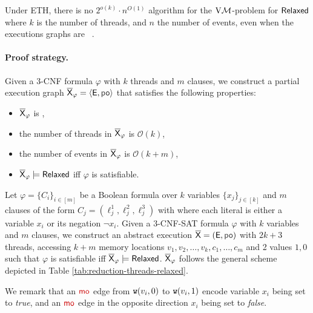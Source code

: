 \begin{theorem}\label{lem:relaxed-finegrained}
    Under ETH, there is no $2^{o(k)} \cdot n^{O(1)}$ algorithm for the $\mathrm{V}\mathcal{M}$-problem for $\mathsf{Relaxed}$ where $k$ is the number of threads, and $n$ the number of events, even when the executions graphs are \threewriter~. 
\end{theorem}

\paragraph*{Proof strategy.} Given a 3-CNF formula $\varphi$ with $k$ threads and $m$ clauses, we construct a partial execution graph $\expartial_\varphi = \tuple{\E, \po}$ that satisfies the following properties:
\begin{itemize}
\item $\overline{\mathsf{\color{black}X}}_\varphi$ is \threewriter,
\item the number of threads in $\overline{\mathsf{\color{black}X}}_\varphi$ is $\mathcal{O}(k)$,
\item the number of events in $\overline{\mathsf{\color{black}X}}_\varphi$ is $\mathcal{O}(k + m)$, 
\item $\overline{\mathsf{\color{black}X}}_\varphi \models \mathsf{Relaxed}$ iff $\varphi$ is satisfiable. 
\end{itemize} 


Let $\varphi=\{C_i\}_{i \in [m]}$ be a Boolean formula over $k$ variables 
$\{x_j\}_{j \in [k]}$ and $m$ clauses of the form $C_j=(\ell_j^1, \ell_j^2, \ell_j^3)$ with where each literal is either a variable $x_i$ or its negation $\neg x_i$. 
Given a 3-CNF-SAT formula $\varphi$ with $k$ variables and $m$ clauses, we construct an abstract execution $\expartial=(\E, \po)$ with $2k+3$ threads, accessing $k+m$ memory locations $v_1, v_2, \dots, v_k, c_1, \dots, c_m$ and 2 values $1, 0$ such that $\varphi$ is satisfiable iff $\overline{\mathsf{\color{black}X}}_\varphi \models \mathsf{Relaxed}$. 
$\overline{\mathsf{\color{black}X}}_\varphi$ follows the general scheme depicted in Table \ref{tab:reduction-threads-relaxed}.

We remark that an $\mo$ edge from $\mathtt{w}(v_i, 0)$ to $\mathtt{w}(v_i,1)$ encode variable $x_i$ being set to \emph{true}, and an $\mo$ edge in the opposite direction $x_i$ being set to \emph{false}. 

